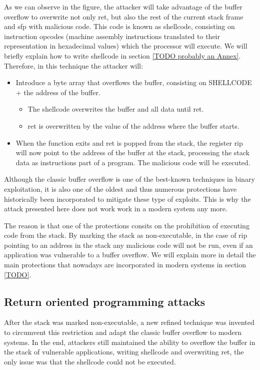 As we can observe in the figure, the attacker will take advantage of the buffer overflow to overwrite not only ret, but also the rest of the current stack frame and sfp with malicious code. This code is known as shellcode, consisting on instruction opcodes (machine assembly instructions translated to their representation in hexadecimal values) which the processor will execute. We will briefly explain how to write shellcode in section \ref{TODO probably an Annex}. Therefore, in this technique the attacker will:
\begin{itemize}
\item Introduce a byte array that overflows the buffer, consisting on SHELLCODE + the address of the buffer.
\begin{itemize}
	\item The shellcode overwrites the buffer and all data until ret.
	\item ret is overwritten by the value of the address where the buffer starts.
\end{itemize}
\item When the function exits and ret is popped from the stack, the register rip will now point to the address of the buffer at the stack, processing the stack data as instructions part of a program. The malicious code will be executed.
\end{itemize}

Although the classic buffer overflow is one of the best-known techniques in binary exploitation, it is also one of the oldest and thus numerous protections have historically been incorporated to mitigate these type of exploits. This is why the attack presented here does not work work in a modern system any more. 

The reason is that one of the protections consits on the prohibition of executing code from the stack. By marking the stack as non-executable, in the case of rip pointing to an address in the stack any malicious code will not be run, even if an application was vulnerable to a buffer overflow. We will explain more in detail the main protections that nowadays are incorporated in modern systems in section \ref{TODO}.

\subsection{Return oriented programming attacks} \label{subsection:rop}
After the stack was marked non-executable, a new refined technique was invented to circumvent this restriction and adapt the classic buffer overflow to modern systems. In the end, attackers still maintained the ability to overflow the buffer in the stack of vulnerable applications, writing shellcode and overwriting ret, the only issue was that the shellcode could not be executed.

